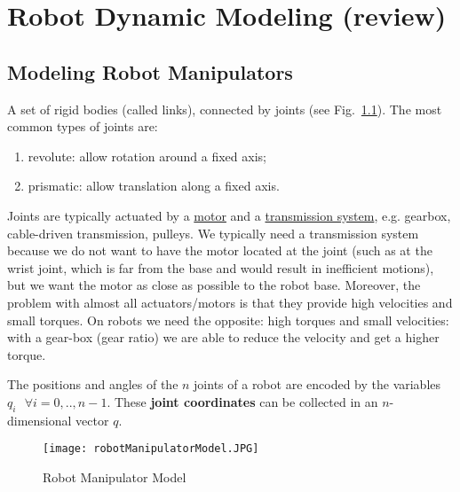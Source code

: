 \chapter{Robot Dynamic Modeling (review)}                
\section{Modeling Robot Manipulators}
                    A set of rigid bodies (called links), connected by joints (see Fig.~\ref{fig:manipulator}). 
                    The most common types of joints are:
                    \begin{enumerate}
                        \item revolute: allow rotation around a fixed axis;
                        \item prismatic: allow translation along a fixed axis.
                    \end{enumerate}
                    Joints are typically actuated by a \underline{motor} and a \underline{transmission system}, e.g. gearbox, cable-driven transmission, pulleys.
                    We typically need a transmission system because we do not want to have the motor located at the joint (such as at the wrist joint, which is far from the base and would result in inefficient motions), but we want the motor as close as possible to the robot base.
                    Moreover, the problem with almost all actuators/motors is that they provide high velocities and small torques.
                    On robots we need the opposite: high torques and small velocities: with a gear-box (gear ratio) we are able to reduce the velocity and get a higher torque. 
                    
                    The positions and angles of the $n$ joints of a robot are encoded by the variables $q_{i} \, \, \, \, \forall i = 0, .., n-1$.
                    These \textbf{joint coordinates} can be collected in an $n$-dimensional vector $q$.
                    \begin{figure}[t]    
                        \texttt{[image: robotManipulatorModel.JPG]}
                        \caption{Robot Manipulator Model}
                        \label{fig:manipulator}
                    \end{figure}
                    
